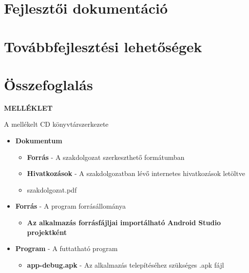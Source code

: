 \documentclass[a4paper,oneside,10pt]{report}
\begin{document}
\chapter{Fejlesztői dokumentáció}
\label{devmanual}


\chapter{Továbbfejlesztési lehetőségek}
\label{tovabbfejlesztes}


\chapter{Összefoglalás}
\label{osszefoglalas}









\newpage

\Large
\begin{center}
	\textbf{MELLÉKLET}
\end{center}
\normalsize
\noindent
A mellékelt CD könyvtárszerkezete


\begin{itemize}
   \item \textbf{Dokumentum}
   \begin{itemize}
       \item \textbf{Forrás} - A szakdolgozat szerkeszthető formátumban
       \item \textbf{Hivatkozások} - A szakdolgozatban lévő internetes hivatkozások letöltve
       \item szakdolgozat.pdf
   \end{itemize}
   \item \textbf{Forrás} - A program forrásállománya
   \begin{itemize}
       \item \textbf{Az alkalmazás forrásfájljai importálható Android Studio projektként}
   \end{itemize}
   \item \textbf{Program} - A futtatható program
   \begin{itemize}
       \item \textbf{app-debug.apk} - Az alkalmazás telepítéséhez szükséges .apk fájl
   \end{itemize}
\end{itemize}





\appendix

\end{document}
